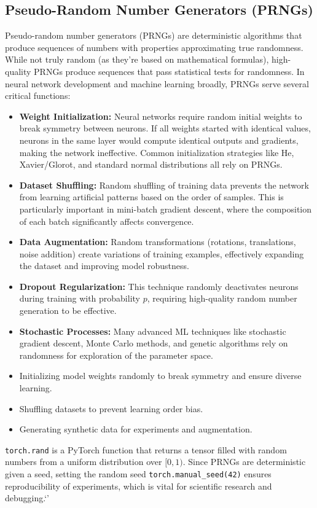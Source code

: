 \documentclass[a4paper, journal]{IEEEtran}
\begin{document}
\subsection{Pseudo-Random Number Generators (PRNGs)}
Pseudo-random number generators (PRNGs) are deterministic algorithms that produce sequences of numbers with properties approximating true randomness. While not truly random (as they're based on mathematical formulas), high-quality PRNGs produce sequences that pass statistical tests for randomness. In neural network development and machine learning broadly, PRNGs serve several critical functions:

\begin{itemize}
    \item \textbf{Weight Initialization:} Neural networks require random initial weights to break symmetry between neurons. If all weights started with identical values, neurons in the same layer would compute identical outputs and gradients, making the network ineffective. Common initialization strategies like He, Xavier/Glorot, and standard normal distributions all rely on PRNGs.

    \item \textbf{Dataset Shuffling:} Random shuffling of training data prevents the network from learning artificial patterns based on the order of samples. This is particularly important in mini-batch gradient descent, where the composition of each batch significantly affects convergence.

    \item \textbf{Data Augmentation:} Random transformations (rotations, translations, noise addition) create variations of training examples, effectively expanding the dataset and improving model robustness.

    \item \textbf{Dropout Regularization:} This technique randomly deactivates neurons during training with probability $p$, requiring high-quality random number generation to be effective.

    \item \textbf{Stochastic Processes:} Many advanced ML techniques like stochastic gradient descent, Monte Carlo methods, and genetic algorithms rely on randomness for exploration of the parameter space.
    \item Initializing model weights randomly to break symmetry and ensure diverse learning.
    \item Shuffling datasets to prevent learning order bias.
    \item Generating synthetic data for experiments and augmentation.
\end{itemize}
\texttt{torch.rand} is a PyTorch function that returns a tensor filled with random numbers from a uniform distribution over \([0,1)\). Since PRNGs are deterministic given a seed, setting the random seed \texttt{torch.manual\_seed(42)} ensures reproducibility of experiments, which is vital for scientific research and debugging.`'
\end{document}
